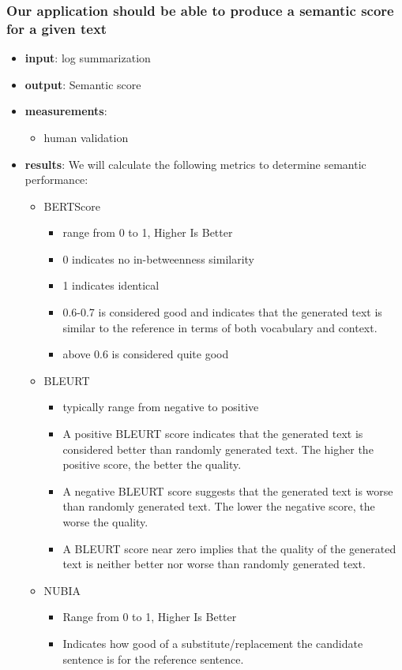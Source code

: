 \documentclass[conference]{IEEEtran}
\begin{document}
\subsubsection{Our application should be able to produce a semantic score for a given text}
\begin{itemize}
    \item \textbf{input}: log summarization
    \item \textbf{output}: Semantic score 
    \item \textbf{measurements}:
    \begin{itemize}
        \item human validation
    \end{itemize}
 \item \textbf{results}: 
     We will calculate the following metrics to determine semantic performance:
    \begin{itemize}
    \item BERTScore \cite{bert-score}
        \begin{itemize} 
        \item range from 0 to 1, Higher Is Better
        \item 0 indicates no in-betweenness similarity
        \item 1 indicates identical
        \item 0.6-0.7 is considered good and indicates that the generated text is similar to the reference in terms of both vocabulary and context.
        \item above 0.6 is considered quite good
        \end{itemize}
    \item BLEURT \cite{bert-score}
        \begin{itemize}
        \item typically range from negative to positive
        \item A positive BLEURT score indicates that the generated text is considered better than randomly generated text. The higher the positive score, the better the quality.
        \item A negative BLEURT score suggests that the generated text is worse than randomly generated text. The lower the negative score, the worse the quality.
        \item A BLEURT score near zero implies that the quality of the generated text is neither better nor worse than randomly generated text.
        \end{itemize}
    \item NUBIA \cite{kane2020nubia}
        \begin{itemize}
        \item Range from 0 to 1, Higher Is Better
        \item Indicates how good of a substitute/replacement the candidate sentence is for the reference sentence.
        \end{itemize}
    \end{itemize}
\end{itemize}
\end{document}
